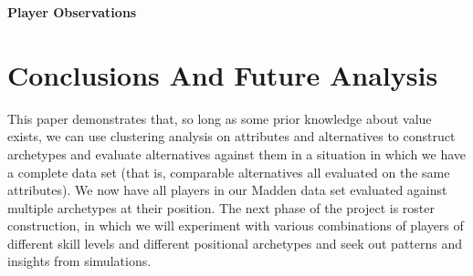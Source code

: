 \documentclass[11pt]{article}
\begin{document}
\textbf{Player Observations}

\section{Conclusions And Future Analysis}
\label{Conclusions}

This paper demonstrates that, so long as some prior knowledge about value exists, we can use clustering analysis on attributes and alternatives to construct archetypes and evaluate alternatives against them in a situation in which we have a complete data set (that is, comparable alternatives all evaluated on the same attributes). We now have all players in our Madden data set evaluated against multiple archetypes at their position.
The next phase of the project is roster construction, in which we will experiment with various combinations of players of different skill levels and different positional archetypes and seek out patterns and insights from simulations.




\end{document}
